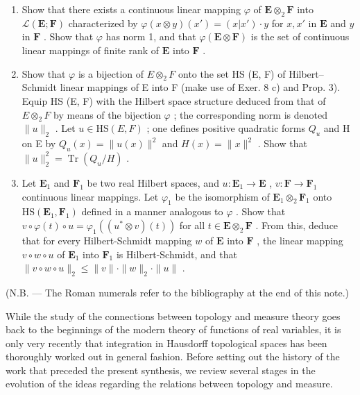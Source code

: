 \begin{enumerate}
\def\labelenumi{\alph{enumi})}
\item
  Show that there exists a continuous linear mapping \(\varphi\) of \(\mathbf{E} \otimes_2 \mathbf{F}\) into \(\mathcal{L}(\mathbf{E}; \mathbf{F})\) characterized by \(\varphi(x \otimes y)(x') = (x|x') \cdot y\) for \(x, x'\) in \(\mathbf{E}\) and \(y\) in \(\mathbf{F}\) . Show that \(\varphi\) has norm 1, and that \(\varphi(\mathbf{E} \otimes \mathbf{F})\) is the set of continuous linear mappings of finite rank of \(\mathbf{E}\) into \(\mathbf{F}\) .
\item
  Show that \(\varphi\) is a bijection of \(E \otimes_2 F\) onto the set HS (E, F) of Hilbert--Schmidt linear mappings of E into F (make use of Exer. 8 c) and Prop. 3). Equip HS (E, F) with the Hilbert space structure deduced from that of \(E \otimes_2 F\) by means of the bijection \(\varphi\) ; the corresponding norm is denoted \(\|u\|_2\) . Let \(u \in \mathrm{HS}(E, F)\) ; one defines positive quadratic forms \(Q_u\) and H on E by \(Q_u(x) = \|u(x)\|^2\) and \(H(x) = \|x\|^2\) . Show that \(\|u\|_2^2 = \operatorname{Tr}(Q_u / H)\) .
\item
  Let \(\mathbf{E}_1\) and \(\mathbf{F}_1\) be two real Hilbert spaces, and \(u: \mathbf{E}_1 \to \mathbf{E}\) , \(v: \mathbf{F} \to \mathbf{F}_1\) continuous linear mappings. Let \(\varphi_1\) be the isomorphism of \(\mathbf{E}_1 \otimes_2 \mathbf{F}_1\) onto \(\mathrm{HS}(\mathbf{E}_1, \mathbf{F}_1)\) defined in a manner analogous to \(\varphi\) . Show that \(v \circ \varphi(t) \circ u = \varphi_1((u^* \otimes v)(t))\) for all \(t \in \mathbf{E} \otimes_2 \mathbf{F}\) . From this, deduce that for every Hilbert-Schmidt mapping \(w\) of \(\mathbf{E}\) into \(\mathbf{F}\) , the linear mapping \(v \circ w \circ u\) of \(\mathbf{E}_1\) into \(\mathbf{F}_1\) is Hilbert-Schmidt, and that \(\|v \circ w \circ u\|_2 \leqslant \|v\| \cdot \|w\|_2 \cdot \|u\|\) .
\end{enumerate}


(N.B. --- The Roman numerals refer to the bibliography at the end of this note.)

While the study of the connections between topology and measure theory goes back to the beginnings of the modern theory of functions of real variables, it is only very recently that integration in Hausdorff topological spaces has been thoroughly worked out in general fashion. Before setting out the history of the work that preceded the present synthesis, we review several stages in the evolution of the ideas regarding the relations between topology and measure.

